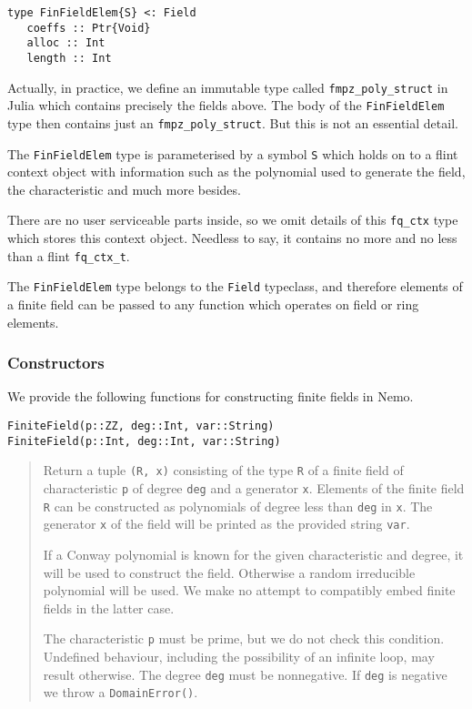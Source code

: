 \documentclass[a4paper,10pt]{article}
\newcommand{\code}{\lstinline}
\newcommand{\desc}[1]{\vspace{-3mm}\begin{quote}#1\end{quote}}
\begin{document}
{{\begin{lstlisting}
type FinFieldElem{S} <: Field
   coeffs :: Ptr{Void}
   alloc :: Int
   length :: Int
\end{lstlisting}

Actually, in practice, we define an immutable type called 
\code{fmpz_poly_struct} in Julia which contains precisely the fields above. The
body of the \code{FinFieldElem} type then contains just an
\code{fmpz_poly_struct}. But this is not an essential detail.

The \code{FinFieldElem} type is parameterised by a symbol \code{S} which holds
on to a flint context object with information such as the polynomial used to
generate the field, the characteristic and much more besides.

There are no user serviceable parts inside, so we omit details of this 
\code{fq_ctx} type which stores this context object. Needless to say, it
contains no more and no less than a flint \code{fq_ctx_t}.

The \code{FinFieldElem} type belongs to the \code{Field} typeclass, and
therefore elements of a finite field can be passed to any function which
operates on field or ring elements.

\subsubsection{Constructors}

We provide the following functions for constructing finite fields in Nemo.

\begin{lstlisting}
FiniteField(p::ZZ, deg::Int, var::String)
FiniteField(p::Int, deg::Int, var::String)
\end{lstlisting}

\desc{Return a tuple \code{(R, x)} consisting of the type \code{R} of a finite
field of characteristic \code{p} of degree \code{deg} and a generator \code{x}.
Elements of the finite field \code{R} can be constructed as polynomials of
degree less than \code{deg} in \code{x}. The generator \code{x} of the field 
will be printed as the provided string \code{var}.

If a Conway polynomial is known for the given characteristic and degree, it
will be used to construct the field. Otherwise a random irreducible polynomial
will be used. We make no attempt to compatibly embed finite fields in the
latter case.

The characteristic \code{p} must be prime, but we do not check this condition.
Undefined behaviour, including the possibility of an infinite loop, may result
otherwise. The degree \code{deg} must be nonnegative. If \code{deg} is 
negative we throw a \code{DomainError()}.}

}}
\end{document}
